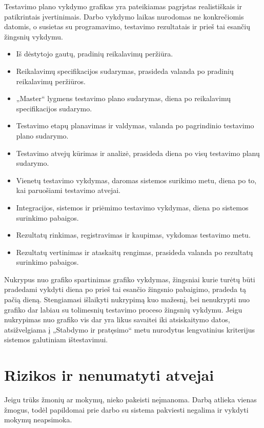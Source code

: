Testavimo plano vykdymo grafikas yra pateikiamas pagrįstas realistiškais ir patikrintais įvertinimais.
Darbo vykdymo laikas nurodomas ne konkrečiomis datomis, o susietas su programavimo, testavimo rezultatais ir prieš tai esančių žingsnių vykdymu.

\begin{itemize}
	\item Iš dėstytojo gautų, pradinių reikalavimų peržiūra.
	\item Reikalavimų specifikacijos sudarymas, prasideda valanda po pradinių reikalavimų peržiūros.
	\item „Master“ lygmens testavimo plano sudarymas, diena po reikalavimų specifikacijos sudarymo.
	\item Testavimo etapų planavimas ir valdymas, valanda po pagrindinio testavimo plano sudarymo.
	\item Testavimo atvejų kūrimas ir analizė, prasideda diena po visų testavimo planų sudarymo.
	\item Vienetų testavimo vykdymas, daromas sistemos surikimo metu, diena po to, kai paruošiami testavimo atvejai.
	\item Integracijos, sistemos ir priėmimo testavimo vykdymas, diena po sistemos surinkimo pabaigos.
	\item Rezultatų rinkimas, registravimas ir kaupimas, vykdomas testavimo metu.
	\item Rezultatų vertinimas ir ataskaitų rengimas, prasideda valanda po rezultatų surinkimo pabaigos.
\end{itemize}

Nukrypus nuo grafiko spartinimas grafiko vykdymas, žingsniai kurie turėtų būti pradedami vykdyti diena po prieš tai esančio žingsnio pabaigimo, pradeda tą pačią dieną. 
Stengiamasi išlaikyti nukrypimą kuo mažesnį, bei nenukrypti nuo grafiko dar labiau su tolimesnių testavimo proceso žingsnių vykdymu. 
Jeigu nukrypimas  nuo grafiko vis dar yra likus savaitei iki atsiskaitymo datos, atsižvelgiama į „Stabdymo ir pratęsimo“ metu nurodytus lengvatinius kriterijus sistemos galutiniam ištestavimui.

\section{Rizikos ir nenumatyti atvejai}

Jeigu trūks žmonių ar mokymų, nieko pakeisti neįmanoma. Darbą atlieka vienas žmogus, todėl papildomai prie darbo su sistema pakviesti negalima ir vykdyti mokymų neapsimoka. 

